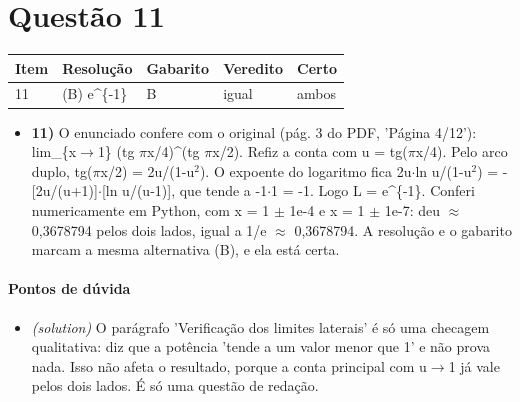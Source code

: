 \documentclass{article}%
\begin{document}
\section*{Questão 11}%
\begin{longtable}{@{}p{} p{} p{} p{} p{}@{}}\toprule Item & Resolução & Gabarito & Veredito & Certo \\ \midrule
11 & (B) e\^{}\{{-}1\} & B & igual & ambos \\
\bottomrule\end{longtable}%
\begin{itemize}%
\item%
\textbf{11)} O enunciado confere com o original (pág. 3 do PDF, 'Página 4/12'): lim\_\{x$\to$1\} (tg $\pi$x/4)\^{}(tg $\pi$x/2). Refiz a conta com u = tg($\pi$x/4). Pelo arco duplo, tg($\pi$x/2) = 2u/(1-u$^2$). O expoente do logaritmo fica 2u$\cdot$ln u/(1-u$^2$) = -{[}2u/(u+1){]}$\cdot${[}ln u/(u-1){]}, que tende a -1$\cdot$1 = -1. Logo L = e\^{}\{{-}1\}. Conferi numericamente em Python, com x = 1 $\pm$ 1e{-}4 e x = 1 $\pm$ 1e{-}7: deu $\approx$ 0,3678794 pelos dois lados, igual a 1/e $\approx$ 0,3678794. A resolução e o gabarito marcam a mesma alternativa (B), e ela está certa.%
\end{itemize}%
\paragraph{Pontos de dúvida}%
\begin{itemize}%
\item%
\textit{(solution)} O parágrafo 'Verificação dos limites laterais' é só uma checagem qualitativa: diz que a potência 'tende a um valor menor que 1' e não prova nada. Isso não afeta o resultado, porque a conta principal com u$\to$1 já vale pelos dois lados. É só uma questão de redação.%
\end{itemize}%
\end{document}
